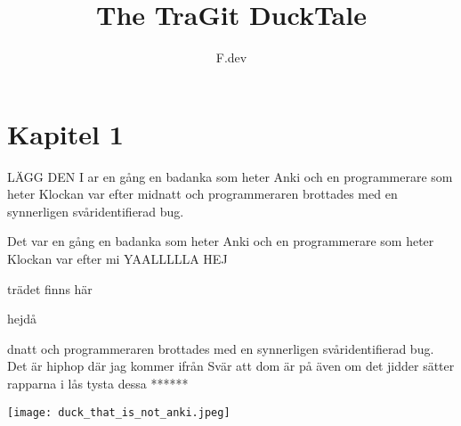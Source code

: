 \documentclass[a4paper]{article}
\begin{document}
\title{The TraGit DuckTale}
\author{F.dev}
\maketitle

\section*{Kapitel 1}

LÄGG DEN I ar en gång en badanka som heter Anki och en programmerare som heter %
Klockan var efter midnatt och programmeraren brottades med en synnerligen svåridentifierad bug.

Det var en gång en badanka som heter Anki och en programmerare som heter %
Klockan var efter mi
YAALLLLLA
HEJ


trädet finns här


hejdå


dnatt och programmeraren brottades med en synnerligen svåridentifierad bug.
Det är hiphop där jag kommer ifrån
Svär att dom är på även om det jidder
sätter rapparna i lås tysta dessa ******

\begin{center}
	\texttt{[image: duck\_that\_is\_not\_anki.jpeg]}
\end{center}


\end{document}
